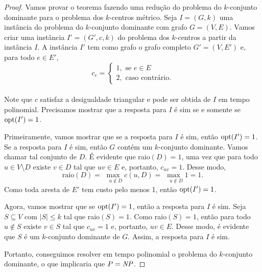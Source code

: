 \begin{proof}
    Vamos provar o teorema fazendo uma redução do problema do $k$-conjunto dominante para o problema dos $k$-centros métrico.
    Seja $I = (G,k)$ uma instância do problema do $k$-conjunto dominante com grafo $G = (V,E)$. Vamos criar uma instância $I' = (G',c,k)$ do problema dos $k$-centros a partir da instância $I$. A instância $I'$ tem como grafo o grafo completo $G' = (V,E')$ e, para todo $e \in E'$,
    \[
    c_e = \begin{cases}
            1, \text{ se } e \in E \\
            2, \text{ caso contrário.} 
            \end{cases}\]\\
    Note que $c$ satisfaz a desigualdade triangular e pode ser obtida de $I$ em tempo polinomial.
    Precisamos mostrar que a resposta para $I$ é sim se e somente se $\mathrm{opt}(I') = 1$.
    
    Primeiramente, vamos mostrar que se a resposta para $I$ é sim, então $\mathrm{opt}(I') = 1$. Se a resposta para $I$ é sim, então $G$ contém um $k$-conjunto dominante. Vamos chamar tal conjunto de $D$. É evidente que raio$(D) = 1$, uma vez que para todo $u \in V\setminus D$ existe $v\in D$ tal que $uv \in E$ e, portanto, $c_{uv} = 1$. Desse modo, 
    \begin{equation}
        \text{raio}(D) = \max_{\quad u \not \in D} c(u,D) = \max_{\quad u \not\in D}1 = 1. \nonumber
    \end{equation}
        Como toda aresta de $E'$ tem custo pelo menos 1, então $\mathrm{opt}(I') = 1$.

    Agora, vamos mostrar que se $\mathrm{opt}(I') = 1$, então a resposta para $I$ é sim. Seja $S \subseteq V$ com $|S|\leq k$ tal que raio$(S) = 1$. Como raio$(S) = 1$, então para todo $u \not \in S$ existe $v \in S$ tal que $c_{uv} = 1$ e, portanto, $uv \in E$. Desse modo, é evidente que $S$ é um $k$-conjunto dominante de $G$. Assim, a resposta para $I$ é sim.


    Portanto, conseguimos resolver em tempo polinomial o problema do $k$-conjunto dominante, o que implicaria que $P = \mathit{NP}$.
\end{proof}

